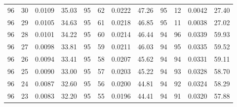 \begin{tabular}{llll|llll|llll}
96 & 30 & 0.0109 & 35.03 & 95 & 62 & 0.0222 & 47.26 & 95 & 12 & 0.0042 & 27.40\\
96 & 29 & 0.0105 & 34.63 & 95 & 61 & 0.0218 & 46.85 & 95 & 11 & 0.0038 & 27.02\\
96 & 28 & 0.0101 & 34.22 & 95 & 60 & 0.0214 & 46.44 & 94 & 96 & 0.0339 & 59.93\\
96 & 27 & 0.0098 & 33.81 & 95 & 59 & 0.0211 & 46.03 & 94 & 95 & 0.0335 & 59.52\\
96 & 26 & 0.0094 & 33.41 & 95 & 58 & 0.0207 & 45.62 & 94 & 94 & 0.0331 & 59.11\\
96 & 25 & 0.0090 & 33.00 & 95 & 57 & 0.0203 & 45.22 & 94 & 93 & 0.0328 & 58.70\\
96 & 24 & 0.0087 & 32.60 & 95 & 56 & 0.0200 & 44.81 & 94 & 92 & 0.0324 & 58.29\\
96 & 23 & 0.0083 & 32.20 & 95 & 55 & 0.0196 & 44.41 & 94 & 91 & 0.0320 & 57.88\\
\bottomrule
\end{tabular}
\newpage
